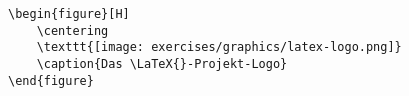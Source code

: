 \begin{verbatim}
\begin{figure}[H]
	\centering
	\texttt{[image: exercises/graphics/latex-logo.png]}
	\caption{Das \LaTeX{}-Projekt-Logo}
\end{figure}
\end{verbatim}
